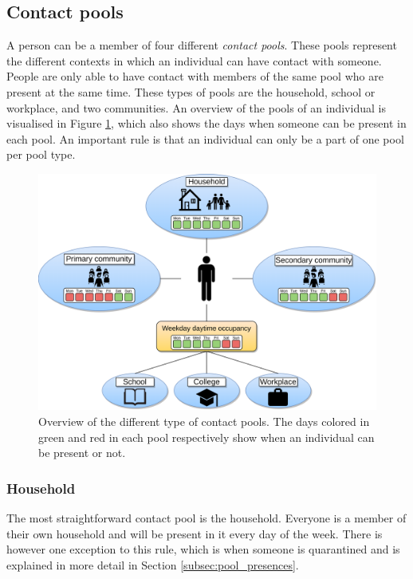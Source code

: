 \subsection{Contact pools}
\label{subsec:contact_pools}
A person can be a member of four different \textit{contact pools}. These pools represent the different contexts in which an individual can have contact with someone. People are only able to have contact with members of the same pool who are present at the same time. These types of pools are the household, school or workplace, and two communities. An overview of the pools of an individual is visualised in Figure \ref{fig:pools_overview}, which also shows the days when someone can be present in each pool. An important rule is that an individual can only be a part of one pool per pool type.

\begin{figure}[ht]
    \centering
    \includegraphics[width=\textwidth]{3 - Stride/fig/Pools_overview.png}
    \caption{Overview of the different type of contact pools. The days colored in green and red in each pool respectively show when an individual can be present or not.}
    \label{fig:pools_overview}
\end{figure}

\subsubsection{Household}
The most straightforward contact pool is the household. Everyone is a member of their own household and will be present in it every day of the week. There is however one exception to this rule, which is when someone is quarantined and is explained in more detail in Section \ref{subsec:pool_presences}.

